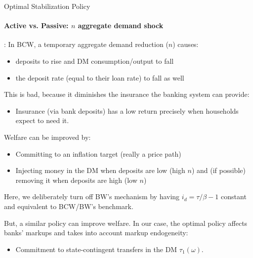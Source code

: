 \documentclass[10pt,english,slidetop,compress,
              blue,mathserif,color=option]{beamer}
\theoremstyle{plain}
\theoremstyle{definition}
\begin{document}
\begin{frame}[allowframebreaks]{Optimal Stabilization Policy}
  \framesubtitle{Active vs. Passive: $n$ aggregate demand shock}


  \citet{Berentsen-Waller2011}: In BCW, a temporary aggregate demand reduction ($n$) causes:
  \begin{itemize}
    \item deposits to rise and DM consumption/output to fall
    \item the deposit rate (equal to their loan rate) to fall as well
  \end{itemize}
  
  This is bad, because it diminishes the insurance the banking system can provide:
    \medskip
    \begin{itemize}
      \item[] Insurance (via bank deposits) has a low return precisely when households expect to need it.
    \end{itemize} 
    \bigskip

  Welfare can be improved by:
  \begin{itemize}
    \item Committing to an inflation target (really a price path)
    \item Injecting money in the DM when deposits are low (high $n$) and (if possible) removing it when deposits are high (low $n$)
  \end{itemize}

  \break
  Here, we deliberately turn off BW's mechanism by having $i_{d} = \tau/\beta -1$ constant and equivalent to BCW/BW's benchmark.

  \bigskip

  But, a similar policy can improve welfare. In our case, the optimal policy affects banks’ markups and takes into account markup endogeneity:

  \begin{itemize}
    \item \alert{Commitment to state-contingent transfers} in the DM $\tau_{1}(\omega)$.
    

\end{itemize}
\end{frame}
\end{document}
